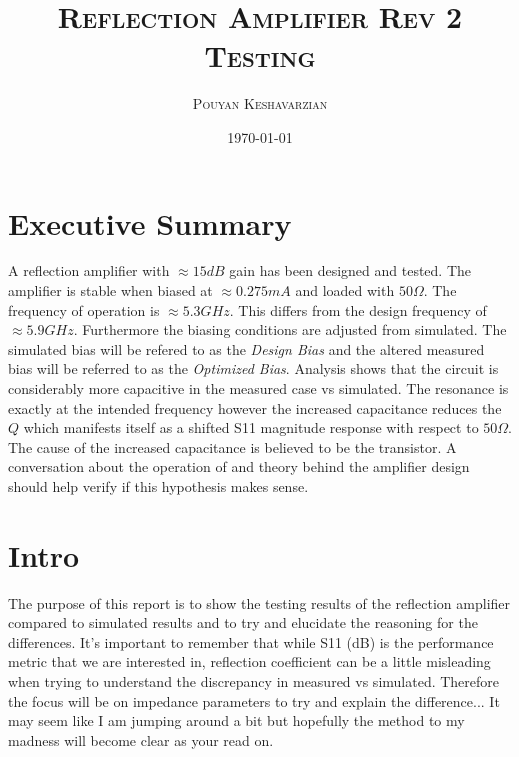 \documentclass{article}                                                         %
\title{\textsc{\textbf{Reflection Amplifier Rev 2 Testing}}} %
\author{\textsc{Pouyan Keshavarzian}}
\date{\today} %
\begin{document}
\maketitle %
\newpage
\tableofcontents
\listoffigures
\listoftables
\newpage
\section{Executive Summary}
A reflection amplifier with $\approx 15dB$ gain has been designed and tested. The amplifier
is stable when biased at $\approx 0.275mA$ and loaded with $ 50\Omega$. The frequency of operation is
$\approx 5.3GHz$. This differs from the design frequency of $ \approx 5.9GHz $. Furthermore the
biasing conditions are adjusted from simulated. The simulated bias will be
refered to as the \textit{Design Bias} and the altered measured bias will be referred to as the
\textit{Optimized Bias}. Analysis shows that the circuit is
considerably more capacitive in the measured case vs simulated. The resonance is exactly at the
intended frequency however the increased capacitance reduces the $ Q$ which manifests
itself as a shifted S11 magnitude response with respect to $ 50\Omega$. The cause of the increased capacitance
is believed to be the transistor. A conversation about the operation of and theory behind the
amplifier design should help verify if this hypothesis makes sense.
\section{Intro}
The purpose of this report is to show the testing results of the reflection amplifier compared to
simulated results and to try and elucidate the reasoning for the differences. It's important to
remember that while S11 (dB) is the performance metric that we are interested in, reflection
coefficient can be a little misleading
when trying to understand the discrepancy in measured vs simulated. Therefore the focus will be on impedance parameters to
try and explain the difference... It may seem like I am jumping around a bit but hopefully the method to my madness will become
clear as your read on.
\end{document}
